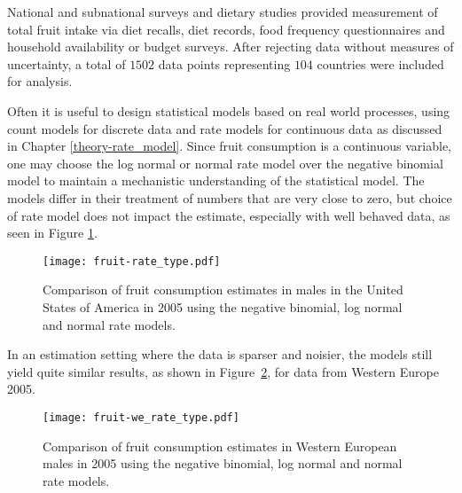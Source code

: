 National and subnational surveys and dietary studies provided
measurement of total fruit intake via diet recalls, diet records, food
frequency questionnaires and household availability or budget surveys.
After rejecting data without measures of uncertainty, a total of $1502$
data points representing $104$ countries were included for analysis.

Often it is useful to design statistical models based on real world
processes, using count models for discrete data and rate models for
continuous data as discussed in Chapter \ref{theory-rate_model}.
Since fruit consumption is a continuous variable, one may choose the
log normal or normal rate model over the negative binomial model to
maintain a mechanistic understanding of the statistical model.  The
models differ in their treatment of numbers that are very close to
zero, but choice of rate model does not impact the estimate,
especially with well behaved data, as seen in Figure
\ref{fig:app-fruit rate type}.

    \begin{figure}[h]
        \begin{center}
            \texttt{[image: fruit-rate\_type.pdf]}
            \caption{Comparison of fruit consumption estimates in
              males in the United States of America in 2005 using the
              negative binomial, log normal and normal rate models.}
            \label{fig:app-fruit rate type}
        \end{center}
    \end{figure}

In an estimation setting where the data is sparser and noisier, the
models still yield quite similar results, as shown in Figure~\ref{fig:app-fruit europe},
for data from Western Europe 2005.

    \begin{figure}[h]
        \begin{center}
            \texttt{[image: fruit-we\_rate\_type.pdf]}
            \caption{Comparison of fruit consumption estimates in
              Western European males in 2005 using the
              negative binomial, log normal and normal rate models.}
            \label{fig:app-fruit europe}
        \end{center}
    \end{figure}



